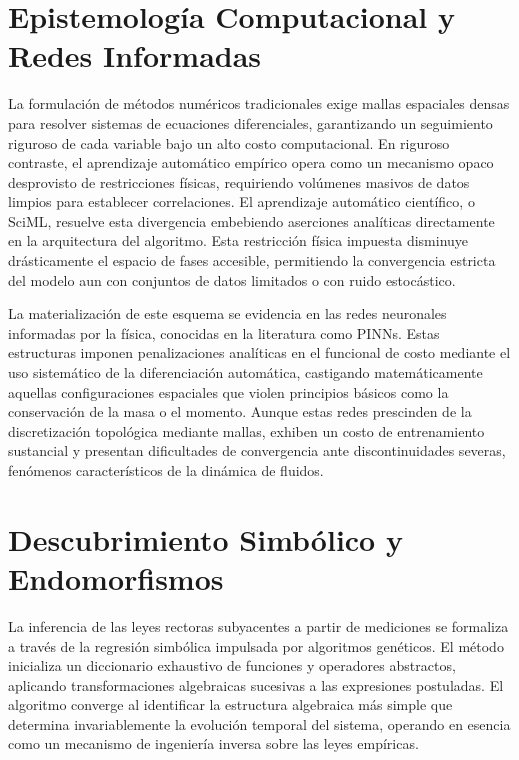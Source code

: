 \section{Epistemología Computacional y Redes Informadas}
\label{sec:epistemologia}

La formulación de métodos numéricos tradicionales exige mallas espaciales
densas para resolver sistemas de ecuaciones diferenciales, garantizando un
seguimiento riguroso de cada variable bajo un alto costo computacional. En
riguroso contraste, el aprendizaje automático empírico opera como un
mecanismo opaco desprovisto de restricciones físicas, requiriendo volúmenes
masivos de datos limpios para establecer correlaciones. El aprendizaje
automático científico, o SciML, resuelve esta divergencia embebiendo
aserciones analíticas directamente en la arquitectura del algoritmo. Esta
restricción física impuesta disminuye drásticamente el espacio de fases
accesible, permitiendo la convergencia estricta del modelo aun con conjuntos
de datos limitados o con ruido estocástico.

La materialización de este esquema se evidencia en las redes neuronales
informadas por la física, conocidas en la literatura como PINNs. Estas
estructuras imponen penalizaciones analíticas en el funcional de costo
mediante el uso sistemático de la diferenciación automática, castigando
matemáticamente aquellas configuraciones espaciales que violen principios
básicos como la conservación de la masa o el momento. Aunque estas redes
prescinden de la discretización topológica mediante mallas, exhiben un
costo de entrenamiento sustancial y presentan dificultades de convergencia
ante discontinuidades severas, fenómenos característicos de la dinámica de
fluidos.

\section{Descubrimiento Simbólico y Endomorfismos}
\label{sec:descubrimiento}

La inferencia de las leyes rectoras subyacentes a partir de mediciones se
formaliza a través de la regresión simbólica impulsada por algoritmos
genéticos. El método inicializa un diccionario exhaustivo de funciones y
operadores abstractos, aplicando transformaciones algebraicas sucesivas a
las expresiones postuladas. El algoritmo converge al identificar la estructura
algebraica más simple que determina invariablemente la evolución temporal del
sistema, operando en esencia como un mecanismo de ingeniería inversa sobre
las leyes empíricas.


